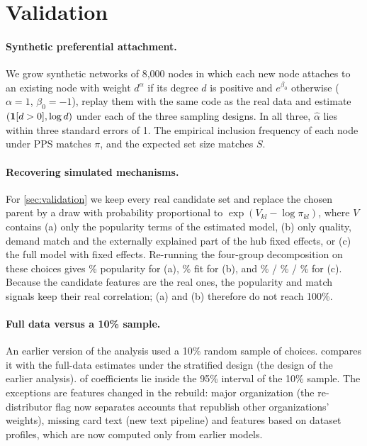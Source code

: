 \section{Validation}
\label{app:validation}

\paragraph{Synthetic preferential attachment.}
We grow synthetic networks of 8,000 nodes in which each new node attaches to an existing node with weight
$d^{\alpha}$ if its degree $d$ is positive and $e^{\beta_0}$ otherwise ($\alpha = 1$, $\beta_0 = -1$), replay them with the same code as the real data and estimate
$(\mathbf{1}[d>0], \log d)$ under each of the three sampling designs. In all three, $\hat\alpha$ lies within three standard
errors of 1. The empirical inclusion frequency of each node under PPS matches $\pi$, and the expected set size
matches $S$.

\paragraph{Recovering simulated mechanisms.}
For \cref{sec:validation} we keep every real candidate set and replace the chosen parent by a draw with probability
proportional to $\exp(V_{kl} - \log \pi_{kl})$, where $V$ contains (a) only the popularity terms of the estimated
model, (b) only quality, demand match and the externally explained part of the hub fixed effects, or (c) the full
model with fixed effects. Re-running the four-group decomposition on these choices gives
\recSfPop\% popularity for (a), \recQfFit\% fit for (b), and \recFullPop\% / \recFullMatch\% / \recFullInertia\%
for (c). Because the candidate features are the real ones, the popularity and match signals keep their real
correlation; (a) and (b) therefore do not reach 100\%.

\paragraph{Full data versus a 10\% sample.}
An earlier version of the analysis used a 10\% random sample of choices.  compares it with the
full-data estimates under the stratified design (the design of the earlier analysis). \valIn{} of \valN{} coefficients
lie inside the 95\% interval of the 10\% sample. The exceptions are features changed in the rebuild: major
organization (the re-distributor flag now separates accounts that republish other organizations' weights), missing
card text (new text pipeline) and features based on dataset profiles, which are now computed only from earlier models.

